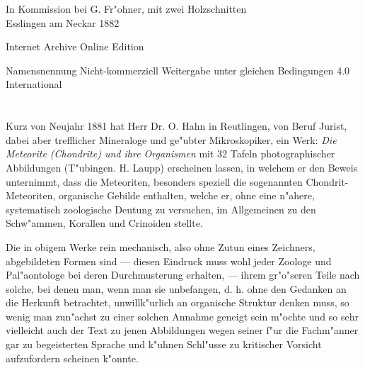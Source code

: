 \documentclass[a4paper, 11pt, oneside]{article}
\begin{document}
\begin{titlepage}
	\vspace*{1\baselineskip} %
	
    {\normalsize In Kommission bei G. Fr"ohner, mit zwei Holzschnitten\\ Esslingen am Neckar 1882} %
    
    \vspace*{\fill}

	{\small\scshape }

    Internet Archive Online Edition  %
	
	{\small Namensnennung Nicht-kommerziell Weitergabe unter gleichen Bedingungen 4.0 International} %
\end{titlepage}
\setlength{\parskip}{1mm plus1mm minus1mm}
\clearpage
\tableofcontents
\clearpage
\LARGE
\pagestyle{fancy}
\fancyhf{}
\cfoot{\swabfamily{\thepage}}
\section*{}
\paragraph{}
Kurz von Neujahr 1881 hat Herr Dr. O. Hahn in Reutlingen, von Beruf Jurist, dabei aber trefflicher Mineraloge und ge"ubter Mikroskopiker, ein Werk: \emph{Die Meteorite (Chondrite) und ihre Organismen} mit 32 Tafeln photographischer Abbildungen (T"ubingen. H. Laupp) erscheinen lassen, in welchem er den Beweis unternimmt, dass die Meteoriten, besonders speziell die sogenannten Chondrit-Meteoriten, organische Gebilde enthalten, welche er, ohne eine n"ahere, systematisch zoologische Deutung zu versuchen, im Allgemeinen zu den Schw"ammen, Korallen und Crinoiden stellte.

Die in obigem Werke rein mechanisch, also ohne Zutun eines Zeichners, abgebildeten Formen sind --- diesen Eindruck muss wohl jeder Zoologe und Pal"aontologe bei deren Durchmusterung erhalten, --- ihrem gr"o"seren Teile nach solche, bei denen man, wenn man sie unbefangen, d. h. ohne den Gedanken an die Herkunft betrachtet, unwillk"urlich an organische Struktur denken muss, so wenig man zun"achst zu einer solchen Annahme geneigt sein m"ochte und so sehr vielleicht auch der Text zu jenen Abbildungen wegen seiner f"ur die Fachm"anner gar zu begeisterten Sprache und k"uhnen Schl"usse zu kritischer Vorsicht aufzufordern scheinen k"onnte.
\end{document}
